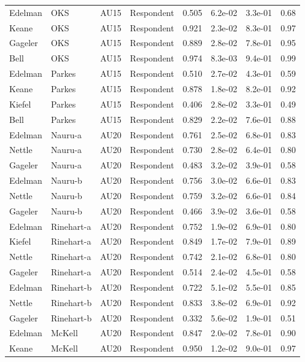 \documentclass{monashthesis}
\begin{document}
\begin{center}
\begin{longtable}{llllllll}
Edelman & OKS & AU15 & Respondent & 0.505 & 6.2e-02 & 3.3e-01 & 0.68 \\
Keane & OKS & AU15 & Respondent & 0.921 & 2.3e-02 & 8.3e-01 & 0.97 \\
Gageler & OKS & AU15 & Respondent & 0.889 & 2.8e-02 & 7.8e-01 & 0.95 \\
Bell & OKS & AU15 & Respondent & 0.974 & 8.3e-03 & 9.4e-01 & 0.99 \\
Edelman & Parkes & AU15 & Respondent & 0.510 & 2.7e-02 & 4.3e-01 & 0.59 \\
Keane & Parkes & AU15 & Respondent & 0.878 & 1.8e-02 & 8.2e-01 & 0.92 \\
Kiefel & Parkes & AU15 & Respondent & 0.406 & 2.8e-02 & 3.3e-01 & 0.49 \\
Bell & Parkes & AU15 & Respondent & 0.829 & 2.2e-02 & 7.6e-01 & 0.88 \\
Edelman & Nauru-a & AU20 & Respondent & 0.761 & 2.5e-02 & 6.8e-01 & 0.83 \\
Nettle & Nauru-a & AU20 & Respondent & 0.730 & 2.8e-02 & 6.4e-01 & 0.80 \\
Gageler & Nauru-a & AU20 & Respondent & 0.483 & 3.2e-02 & 3.9e-01 & 0.58 \\
Edelman & Nauru-b & AU20 & Respondent & 0.756 & 3.0e-02 & 6.6e-01 & 0.83 \\
Nettle & Nauru-b & AU20 & Respondent & 0.759 & 3.2e-02 & 6.6e-01 & 0.84 \\
Gageler & Nauru-b & AU20 & Respondent & 0.466 & 3.9e-02 & 3.6e-01 & 0.58 \\
Edelman & Rinehart-a & AU20 & Respondent & 0.752 & 1.9e-02 & 6.9e-01 & 0.80 \\
Kiefel & Rinehart-a & AU20 & Respondent & 0.849 & 1.7e-02 & 7.9e-01 & 0.89 \\
Nettle & Rinehart-a & AU20 & Respondent & 0.742 & 2.1e-02 & 6.8e-01 & 0.80 \\
Gageler & Rinehart-a & AU20 & Respondent & 0.514 & 2.4e-02 & 4.5e-01 & 0.58 \\
Edelman & Rinehart-b & AU20 & Respondent & 0.722 & 5.1e-02 & 5.5e-01 & 0.85 \\
Nettle & Rinehart-b & AU20 & Respondent & 0.833 & 3.8e-02 & 6.9e-01 & 0.92 \\
Gageler & Rinehart-b & AU20 & Respondent & 0.332 & 5.6e-02 & 1.9e-01 & 0.51 \\
Edelman & McKell & AU20 & Respondent & 0.847 & 2.0e-02 & 7.8e-01 & 0.90 \\
Keane & McKell & AU20 & Respondent & 0.950 & 1.2e-02 & 9.0e-01 & 0.97 \\

\end{longtable}
\end{center}
\end{document}
